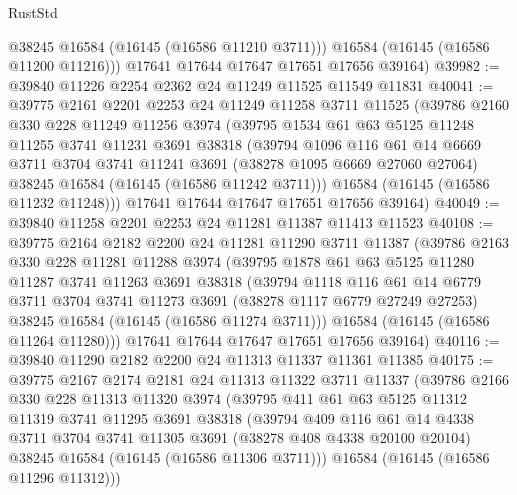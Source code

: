 \begin{lexlean}{RustStd}
\begin{coremodule}
          @38245
          @16584
          (@16145 (@16586 @11210 @3711)))
        @16584
        (@16145 (@16586 @11200 @11216)))
      @17641
      @17644
      @17647
      @17651
      @17656
      @39164)
@39982 := @39840 @11226 @2254 @2362 @24 @11249 @11525 @11549 @11831
@40041 := @39775
    @2161
    @2201
    @2253
    @24
    @11249
    @11258
    @3711
    @11525
    (@39786
      @2160
      @330
      @228
      @11249
      @11256
      @3974
      (@39795
        @1534
        @61
        @63
        @5125
        @11248
        @11255
        @3741
        @11231
        @3691
        @38318
        (@39794
          @1096
          @116
          @61
          @14
          @6669
          @3711
          @3704
          @3741
          @11241
          @3691
          (@38278 @1095 @6669 @27060 @27064)
          @38245
          @16584
          (@16145 (@16586 @11242 @3711)))
        @16584
        (@16145 (@16586 @11232 @11248)))
      @17641
      @17644
      @17647
      @17651
      @17656
      @39164)
@40049 := @39840 @11258 @2201 @2253 @24 @11281 @11387 @11413 @11523
@40108 := @39775
    @2164
    @2182
    @2200
    @24
    @11281
    @11290
    @3711
    @11387
    (@39786
      @2163
      @330
      @228
      @11281
      @11288
      @3974
      (@39795
        @1878
        @61
        @63
        @5125
        @11280
        @11287
        @3741
        @11263
        @3691
        @38318
        (@39794
          @1118
          @116
          @61
          @14
          @6779
          @3711
          @3704
          @3741
          @11273
          @3691
          (@38278 @1117 @6779 @27249 @27253)
          @38245
          @16584
          (@16145 (@16586 @11274 @3711)))
        @16584
        (@16145 (@16586 @11264 @11280)))
      @17641
      @17644
      @17647
      @17651
      @17656
      @39164)
@40116 := @39840 @11290 @2182 @2200 @24 @11313 @11337 @11361 @11385
@40175 := @39775
    @2167
    @2174
    @2181
    @24
    @11313
    @11322
    @3711
    @11337
    (@39786
      @2166
      @330
      @228
      @11313
      @11320
      @3974
      (@39795
        @411
        @61
        @63
        @5125
        @11312
        @11319
        @3741
        @11295
        @3691
        @38318
        (@39794
          @409
          @116
          @61
          @14
          @4338
          @3711
          @3704
          @3741
          @11305
          @3691
          (@38278 @408 @4338 @20100 @20104)
          @38245
          @16584
          (@16145 (@16586 @11306 @3711)))
        @16584
        (@16145 (@16586 @11296 @11312)))

\end{coremodule}
\end{lexlean}
